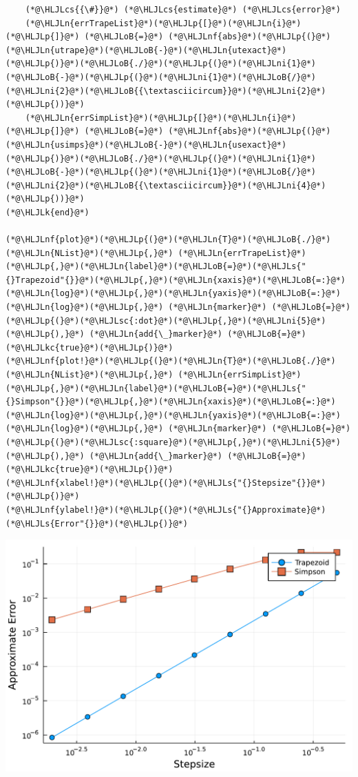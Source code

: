 \documentclass[12pt,a4paper]{article}
\newcommand{\HLJLk}[1]{\textcolor[RGB]{148,91,176}{\textbf{#1}}}
\newcommand{\HLJLkc}[1]{\textcolor[RGB]{59,151,46}{\textit{#1}}}
\newcommand{\HLJLn}[1]{#1}
\newcommand{\HLJLnf}[1]{\textcolor[RGB]{66,102,213}{#1}}
\newcommand{\HLJLs}[1]{\textcolor[RGB]{201,61,57}{#1}}
\newcommand{\HLJLsc}[1]{\textcolor[RGB]{201,61,57}{#1}}
\newcommand{\HLJLni}[1]{\textcolor[RGB]{59,151,46}{#1}}
\newcommand{\HLJLoB}[1]{\textcolor[RGB]{102,102,102}{\textbf{#1}}}
\newcommand{\HLJLp}[1]{#1}
\newcommand{\HLJLcs}[1]{\textcolor[RGB]{153,153,119}{\textit{#1}}}
\begin{document}
\begin{lstlisting}
    (*@\HLJLcs{{\#}}@*) (*@\HLJLcs{estimate}@*) (*@\HLJLcs{error}@*)
    (*@\HLJLn{errTrapeList}@*)(*@\HLJLp{[}@*)(*@\HLJLn{i}@*)(*@\HLJLp{]}@*) (*@\HLJLoB{=}@*) (*@\HLJLnf{abs}@*)(*@\HLJLp{(}@*)(*@\HLJLn{utrape}@*)(*@\HLJLoB{-}@*)(*@\HLJLn{utexact}@*)(*@\HLJLp{)}@*)(*@\HLJLoB{./}@*)(*@\HLJLp{(}@*)(*@\HLJLni{1}@*)(*@\HLJLoB{-}@*)(*@\HLJLp{(}@*)(*@\HLJLni{1}@*)(*@\HLJLoB{/}@*)(*@\HLJLni{2}@*)(*@\HLJLoB{{\textasciicircum}}@*)(*@\HLJLni{2}@*)(*@\HLJLp{))}@*)
    (*@\HLJLn{errSimpList}@*)(*@\HLJLp{[}@*)(*@\HLJLn{i}@*)(*@\HLJLp{]}@*) (*@\HLJLoB{=}@*) (*@\HLJLnf{abs}@*)(*@\HLJLp{(}@*)(*@\HLJLn{usimps}@*)(*@\HLJLoB{-}@*)(*@\HLJLn{usexact}@*)(*@\HLJLp{)}@*)(*@\HLJLoB{./}@*)(*@\HLJLp{(}@*)(*@\HLJLni{1}@*)(*@\HLJLoB{-}@*)(*@\HLJLp{(}@*)(*@\HLJLni{1}@*)(*@\HLJLoB{/}@*)(*@\HLJLni{2}@*)(*@\HLJLoB{{\textasciicircum}}@*)(*@\HLJLni{4}@*)(*@\HLJLp{))}@*)
(*@\HLJLk{end}@*)

(*@\HLJLnf{plot}@*)(*@\HLJLp{(}@*)(*@\HLJLn{T}@*)(*@\HLJLoB{./}@*)(*@\HLJLn{NList}@*)(*@\HLJLp{,}@*) (*@\HLJLn{errTrapeList}@*)(*@\HLJLp{,}@*)(*@\HLJLn{label}@*)(*@\HLJLoB{=}@*)(*@\HLJLs{"{}Trapezoid"{}}@*)(*@\HLJLp{,}@*)(*@\HLJLn{xaxis}@*)(*@\HLJLoB{=:}@*)(*@\HLJLn{log}@*)(*@\HLJLp{,}@*)(*@\HLJLn{yaxis}@*)(*@\HLJLoB{=:}@*)(*@\HLJLn{log}@*)(*@\HLJLp{,}@*) (*@\HLJLn{marker}@*) (*@\HLJLoB{=}@*) (*@\HLJLp{(}@*)(*@\HLJLsc{:dot}@*)(*@\HLJLp{,}@*)(*@\HLJLni{5}@*)(*@\HLJLp{),}@*) (*@\HLJLn{add{\_}marker}@*) (*@\HLJLoB{=}@*) (*@\HLJLkc{true}@*)(*@\HLJLp{)}@*)
(*@\HLJLnf{plot!}@*)(*@\HLJLp{(}@*)(*@\HLJLn{T}@*)(*@\HLJLoB{./}@*)(*@\HLJLn{NList}@*)(*@\HLJLp{,}@*) (*@\HLJLn{errSimpList}@*)(*@\HLJLp{,}@*)(*@\HLJLn{label}@*)(*@\HLJLoB{=}@*)(*@\HLJLs{"{}Simpson"{}}@*)(*@\HLJLp{,}@*)(*@\HLJLn{xaxis}@*)(*@\HLJLoB{=:}@*)(*@\HLJLn{log}@*)(*@\HLJLp{,}@*)(*@\HLJLn{yaxis}@*)(*@\HLJLoB{=:}@*)(*@\HLJLn{log}@*)(*@\HLJLp{,}@*) (*@\HLJLn{marker}@*) (*@\HLJLoB{=}@*) (*@\HLJLp{(}@*)(*@\HLJLsc{:square}@*)(*@\HLJLp{,}@*)(*@\HLJLni{5}@*)(*@\HLJLp{),}@*) (*@\HLJLn{add{\_}marker}@*) (*@\HLJLoB{=}@*) (*@\HLJLkc{true}@*)(*@\HLJLp{)}@*)
(*@\HLJLnf{xlabel!}@*)(*@\HLJLp{(}@*)(*@\HLJLs{"{}Stepsize"{}}@*)(*@\HLJLp{)}@*)
(*@\HLJLnf{ylabel!}@*)(*@\HLJLp{(}@*)(*@\HLJLs{"{}Approximate}@*) (*@\HLJLs{Error"{}}@*)(*@\HLJLp{)}@*)
\end{lstlisting}

\includegraphics[width=\linewidth]{figures/ass_1_report_2_1.pdf}
\end{document}
